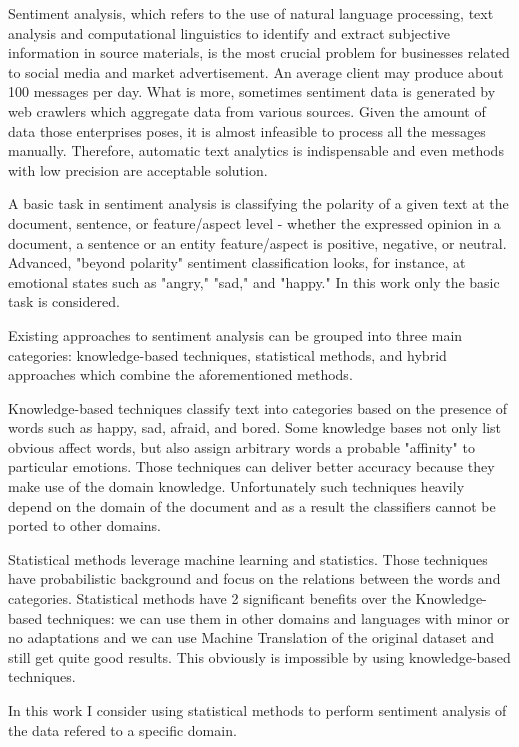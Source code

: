 \documentclass[12pt]{report}
\begin{document}
Sentiment analysis, which refers to the use of natural language processing, text analysis and computational linguistics to identify and extract subjective information in source materials, is the most crucial problem for businesses related to social media and market advertisement. An average client may produce about 100 messages per day. What is more, sometimes sentiment data is generated by web crawlers which aggregate data from various sources. Given the amount of data those enterprises poses, it is almost infeasible to process all the messages manually. Therefore, automatic text analytics is indispensable and even methods with low precision are acceptable solution.

A basic task in sentiment analysis is classifying the polarity of a given text at the document, sentence, or feature/aspect level - whether the expressed opinion in a document, a sentence or an entity feature/aspect is positive, negative, or neutral. Advanced, "beyond polarity" sentiment classification looks, for instance, at emotional states such as "angry," "sad," and "happy." In this work only the basic task is considered.

Existing approaches to sentiment analysis can be grouped into three main categories: knowledge-based techniques, statistical methods, and hybrid approaches which combine the aforementioned methods.

Knowledge-based techniques classify text into categories based on the presence of words such as happy, sad, afraid, and bored. Some knowledge bases not only list obvious affect words, but also assign arbitrary words a probable "affinity" to particular emotions. Those techniques can deliver better accuracy because they make use of the domain knowledge. Unfortunately such techniques heavily depend on the domain of the document and as a result the classifiers cannot be ported to other domains.

Statistical methods leverage machine learning and statistics. Those techniques have probabilistic background and focus on the relations between the words and categories. Statistical methods have 2 significant benefits over the Knowledge-based techniques: we can use them in other domains and languages with minor or no adaptations and we can use Machine Translation of the original dataset and still get quite good results. This obviously is impossible by using knowledge-based techniques.

In this work I consider using statistical methods to perform sentiment analysis of the data refered to a specific domain.
\end{document}
